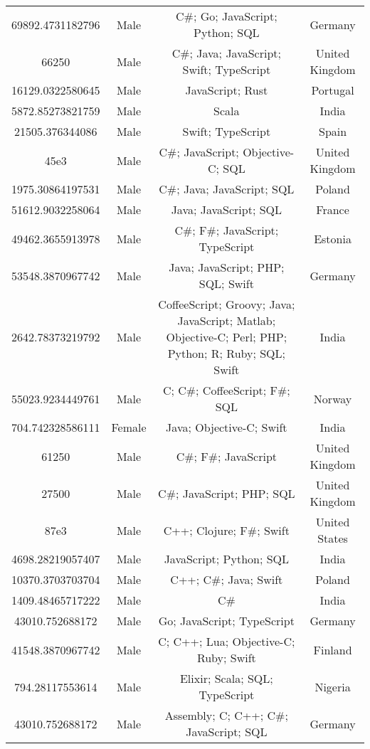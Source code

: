 \begin{center}
\begin{tabular}{ |c|c|c|c| }
69892.4731182796  &  Male  &  C\#; Go; JavaScript; Python; SQL  &  Germany  \\ 
66250  &  Male  &  C\#; Java; JavaScript; Swift; TypeScript  &  United Kingdom  \\ 
16129.0322580645  &  Male  &  JavaScript; Rust  &  Portugal  \\ 
5872.85273821759  &  Male  &  Scala  &  India  \\ 
21505.376344086  &  Male  &  Swift; TypeScript  &  Spain  \\ 
45e3  &  Male  &  C\#; JavaScript; Objective-C; SQL  &  United Kingdom  \\ 
1975.30864197531  &  Male  &  C\#; Java; JavaScript; SQL  &  Poland  \\ 
51612.9032258064  &  Male  &  Java; JavaScript; SQL  &  France  \\ 
49462.3655913978  &  Male  &  C\#; F\#; JavaScript; TypeScript  &  Estonia  \\ 
53548.3870967742  &  Male  &  Java; JavaScript; PHP; SQL; Swift  &  Germany  \\ 
2642.78373219792  &  Male  &  CoffeeScript; Groovy; Java; JavaScript; Matlab; Objective-C; Perl; PHP; Python; R; Ruby; SQL; Swift  &  India  \\ 
55023.9234449761  &  Male  &  C; C\#; CoffeeScript; F\#; SQL  &  Norway  \\ 
704.742328586111  &  Female  &  Java; Objective-C; Swift  &  India  \\ 
61250  &  Male  &  C\#; F\#; JavaScript  &  United Kingdom  \\ 
27500  &  Male  &  C\#; JavaScript; PHP; SQL  &  United Kingdom  \\ 
87e3  &  Male  &  C++; Clojure; F\#; Swift  &  United States  \\ 
4698.28219057407  &  Male  &  JavaScript; Python; SQL  &  India  \\ 
10370.3703703704  &  Male  &  C++; C\#; Java; Swift  &  Poland  \\ 
1409.48465717222  &  Male  &  C\#  &  India  \\ 
43010.752688172  &  Male  &  Go; JavaScript; TypeScript  &  Germany  \\ 
41548.3870967742  &  Male  &  C; C++; Lua; Objective-C; Ruby; Swift  &  Finland  \\ 
794.28117553614  &  Male  &  Elixir; Scala; SQL; TypeScript  &  Nigeria  \\ 
43010.752688172  &  Male  &  Assembly; C; C++; C\#; JavaScript; SQL  &  Germany  \\ 

\end{tabular}
\end{center}

